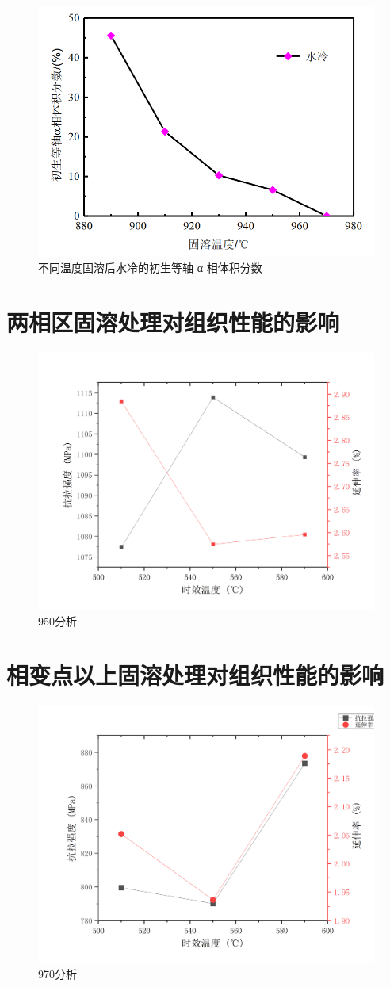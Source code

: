 \begin{figure}[h!]
	\centering
	\includegraphics[width=0.7\linewidth]{pic/a相分布与塑性的关系}
	\caption{不同温度固溶后水冷的初生等轴 α 相体积分数}
	\label{fig:a}
\end{figure}

\section{两相区固溶处理对组织性能的影响}


\begin{figure}[h!]
	\centering
	\includegraphics[width=0.7\linewidth]{pic/950分析}
	\caption{950分析}
	\label{fig:950}
\end{figure}

\section{相变点以上固溶处理对组织性能的影响}

\begin{figure}[h!]
	\centering
	\includegraphics[width=0.7\linewidth]{pic/970分析}
	\caption{970分析}
	\label{fig:970}
\end{figure}
